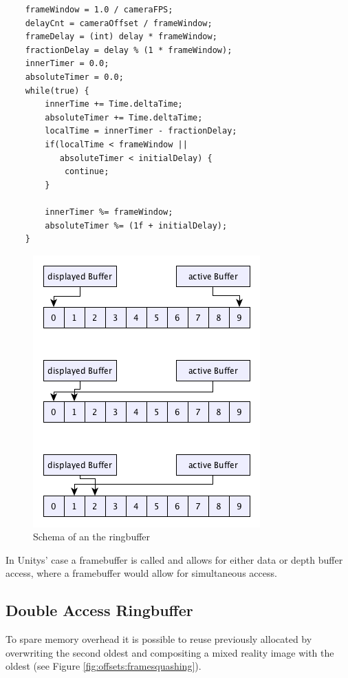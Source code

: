 \begin{lstlisting}
	frameWindow = 1.0 / cameraFPS;
	delayCnt = cameraOffset / frameWindow;
	frameDelay = (int) delay * frameWindow;
	fractionDelay = delay % (1 * frameWindow);
	innerTimer = 0.0;
	absoluteTimer = 0.0;
	while(true) {
		innerTime += Time.deltaTime;
		absoluteTimer += Time.deltaTime;
		localTime = innerTimer - fractionDelay;
		if(localTime < frameWindow ||
		   absoluteTimer < initialDelay) {
			continue;
		}
		
		innerTimer %= frameWindow;
		absoluteTimer %= (1f + initialDelay);
	}
\end{lstlisting}

\begin{figure}[htb]
	\centering
	\includegraphics[width=.5\textwidth]{gfx/ringbuffer_schematics.png}
	\caption{Schema of an the ringbuffer}
	\label{fig:offsets:ringbuffer}
\end{figure}


In Unitys' case a framebuffer is called  and allows 
for either data or depth buffer access, where a framebuffer would allow for 
simultaneous access.

\subsection{Double Access Ringbuffer}

To spare memory overhead it is possible to reuse previously allocated 
 by overwriting the second oldest  and 
compositing a mixed reality image with the oldest (see 
Figure \ref{fig:offsets:framesquashing}).

